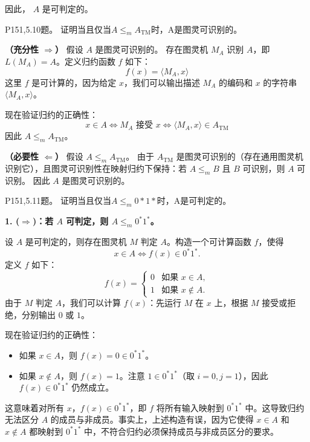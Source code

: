 \documentclass[11pt,addpoints,answers]{exam}
\begin{document}
\begin{questions}
\begin{solution}
    因此， $A$ 是可判定的。
\end{solution}



\question P151,5.10题。
证明当且仅当$A\leq _{m} A_\text{TM}$时，A是图灵可识别的。
\begin{solution}
	\noindent \textbf{（充分性 $\Rightarrow$）} 假设 $A$ 是图灵可识别的。  
    存在图灵机 $M_A$ 识别 $A$，即 $L(M_A) = A$。定义归约函数 $f$ 如下：
    \[
    f(x) = \langle M_A, x \rangle
    \]
    这里 $f$ 是可计算的，因为给定 $x$，我们可以输出描述 $M_A$ 的编码和 $x$ 的字符串 $\langle M_A, x \rangle$。
    
    现在验证归约的正确性：
    \[
    x \in A \iff M_A \text{ 接受 } x \iff \langle M_A, x \rangle \in A_{\text{TM}}
    \]
    因此 $A \leq_m A_{\text{TM}}$。
    
    \vspace{0.5em}
    \noindent \textbf{（必要性 $\Leftarrow$）} 假设 $A \leq_m A_{\text{TM}}$。  
    由于 $A_{\text{TM}}$ 是图灵可识别的（存在通用图灵机识别它），且图灵可识别性在映射归约下保持：若 $A \leq_m B$ 且 $B$ 可识别，则 $A$ 可识别。  
    因此 $A$ 是图灵可识别的。
\end{solution}


\question P151,5.11题。
证明当且仅当$A\leq _{m} 0*1*$时，A是可判定的。
\begin{solution}

    \noindent \textbf{1. ($\Rightarrow$)：若 $A$ 可判定，则 $A \leq_m 0^*1^*$。}
    
    设 $A$ 是可判定的，则存在图灵机 $M$ 判定 $A$。构造一个可计算函数 $f$，使得
    \[
    x \in A \iff f(x) \in 0^*1^*.
    \]
    定义 $f$ 如下：
    \[
    f(x) = 
    \begin{cases}
    0 & \text{如果 } x \in A, \\
    1 & \text{如果 } x \notin A.
    \end{cases}
    \]
    由于 $M$ 判定 $A$，我们可以计算 $f(x)$：先运行 $M$ 在 $x$ 上，根据 $M$ 接受或拒绝，分别输出 $0$ 或 $1$。
    
    现在验证归约的正确性：
    \begin{itemize}
        \item 如果 $x \in A$，则 $f(x) = 0 \in 0^*1^*$。
        \item 如果 $x \notin A$，则 $f(x) = 1$。注意 $1 \in 0^*1^*$（取 $i=0, j=1$），因此 $f(x) \in 0^*1^*$ 仍然成立。
    \end{itemize}
    这意味着对所有 $x$，$f(x) \in 0^*1^*$，即 $f$ 将所有输入映射到 $0^*1^*$ 中。这导致归约无法区分 $A$ 的成员与非成员。事实上，上述构造有误，因为它使得 $x \in A$ 和 $x \notin A$ 都映射到 $0^*1^*$ 中，不符合归约必须保持成员与非成员区分的要求。
    

\end{solution}
\end{questions}
\end{document}

